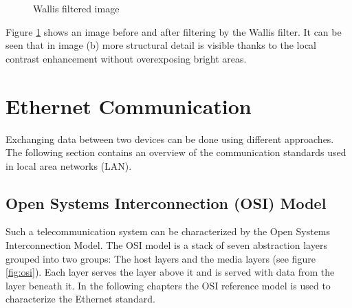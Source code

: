 \begin{figure}[t!]%
    \centering
    \qquad
    \caption{Wallis filtered image}%
    \label{fig:mission:wallisoutputimages}%
\end{figure}

Figure \ref{fig:mission:wallisoutputimages} shows an image before and after
filtering by the Wallis filter. It can be seen that in image (b) more
structural detail is visible thanks to the local contrast enhancement without
overexposing bright areas.

%
%
\section{Ethernet Communication} \label{chapt:theory:ethernet}
Exchanging data between two devices can be done using different approaches. The
following section contains an overview of the communication standards used in
local area networks (LAN).


\subsection{Open Systems Interconnection (OSI) Model}
Such a telecommunication system can be characterized by the Open Systems 
Interconnection Model. The OSI model is a stack of seven abstraction layers 
grouped into two groups: The host layers and the media layers (see figure \ref{fig:osi}). 
Each layer serves the layer above it and is served with data from the layer
beneath it. In the following chapters the OSI reference model is used to
characterize the Ethernet standard.

